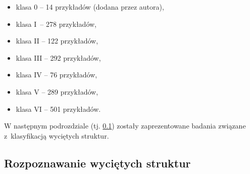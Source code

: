 \begin{itemize}[label=\textbullet]
	\item klasa 0 – 14 przykładów (dodana przez autora),
	\item klasa I~– 278 przykładów,
	\item klasa II – 122 przykładów,
	\item klasa III – 292 przykładów,
	\item klasa IV – 76 przykładów,
	\item klasa V – 289 przykładów,
	\item klasa VI – 501 przykładów.
\end{itemize}
W następnym podrozdziale (tj. \ref{klasyfikacja.struktur}) zostały zaprezentowane badania związane z~klasyfikacją wyciętych struktur.

\subsection{Rozpoznawanie wyciętych struktur}
\label{klasyfikacja.struktur}

